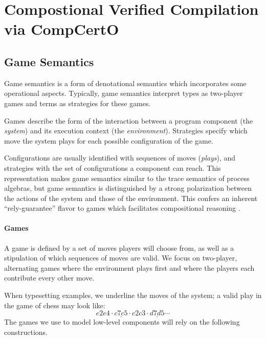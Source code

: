 \section{Compostional Verified Compilation via CompCertO}


\subsection{Game Semantics} \label{sec:gamesem} %


Game semantics is a form of denotational semantics which
incorporates some operational aspects.
Typically,
game semantics interpret
types as two-player games
and terms as strategies for these games.

Games describe the form of the interaction
between a program component %
(the \emph{system})
and its execution context
(the \emph{environment}).
Strategies
specify which move the system plays
for each possible configuration of the game.

Configurations are usually identified with sequences of moves
(\emph{plays}),
and strategies with the set of configurations
a component can reach.
This representation makes
game semantics similar to
the trace semantics of process algebras,
but game semantics is distinguished
by a strong polarization between
the actions of the system and those of the environment.
This confers an inherent ``rely-guarantee'' flavor
to games which facilitates compositional reasoning
\cite{cspgs}.


\paragraph{Games} \label{sec:mainideas:gs:games} %

A game is defined by a set of moves
players will choose from,
as well as a stipulation of which
sequences of moves are valid.
We focus on two-player, alternating games
where the environment plays first and
where the players
each contribute every other move.

When typesetting examples,
we underline the moves of the system;
a valid play in the game of chess may look like:
\[ e2e4 \cdot \underline{c7c5} \cdot c2c3 \cdot \underline{d7d5} \cdots \]
The games we use to model low-level components
will rely on the following constructions.

